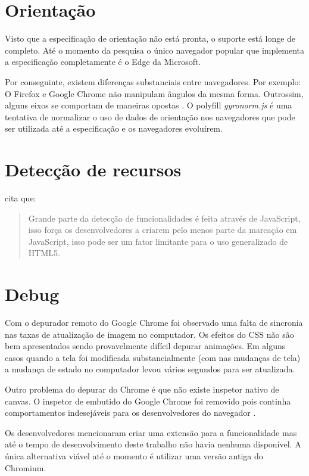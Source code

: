 \section{Orientação}

Visto que a especificação de orientação não está pronta, o suporte
está longe de completo. Até o momento da pesquisa o único navegador
popular que implementa a especificação completamente é o Edge da
Microsoft.

Por conseguinte, existem diferenças substanciais entre navegadores.
Por exemplo: O Firefox e Google Chrome não manipulam ângulos da
mesma forma. Outrossim, alguns eixos se comportam de maneiras opostas
\autocite{mdnOrientation}. O polyfill \textit{gyronorm.js} é uma
tentativa de normalizar o uso de dados de orientação nos navegadores
que pode ser utilizada até a especificação e os navegadores
evoluírem.

\section{Detecção de recursos}

\citet{diveIntohtml} cita que:
\begin{quote}
Grande parte da detecção de funcionalidades é feita através de
JavaScript, isso força os desenvolvedores a criarem pelo menos parte da
marcação em JavaScript, isso pode ser um fator limitante para o uso
generalizado de HTML5.
\end{quote}

\section{Debug}

Com o depurador remoto do Google Chrome foi observado uma falta de
sincronia nas taxas de atualização de imagem no computador. Os
efeitos do CSS não são bem apresentados sendo provavelmente difícil
depurar animações. Em alguns casos quando a tela foi modificada
substancialmente (com nas mudanças de tela) a mudança de estado no
computador levou vários segundos para ser atualizada.

Outro problema do depurar do Chrome é que não existe inspetor nativo
de canvas. O inspetor de embutido do Google Chrome foi removido pois
continha comportamentos indesejáveis para os desenvolvedores do
navegador \autocite{canvasinspector}.

Os desenvolvedores mencionaram criar uma extensão para a funcionalidade
mas até o tempo de desenvolvimento deste trabalho não havia nenhuma
disponível. A única alternativa viável até o momento é utilizar uma
versão antiga do Chromium.

